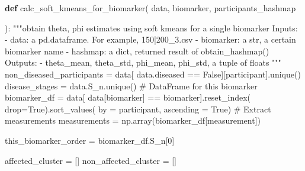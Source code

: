 \documentclass[
  letterpaper,
  DIV=11,
  numbers=noendperiod]{scrreprt}
\newenvironment{Shaded}{\begin{snugshade}}{\end{snugshade}}
\newcommand{\CommentTok}[1]{\textcolor[rgb]{0.37,0.37,0.37}{#1}}
\newcommand{\DecValTok}[1]{\textcolor[rgb]{0.68,0.00,0.00}{#1}}
\newcommand{\KeywordTok}[1]{\textcolor[rgb]{0.00,0.23,0.31}{\textbf{#1}}}
\newcommand{\NormalTok}[1]{\textcolor[rgb]{0.00,0.23,0.31}{#1}}
\newcommand{\OperatorTok}[1]{\textcolor[rgb]{0.37,0.37,0.37}{#1}}
\newcommand{\StringTok}[1]{\textcolor[rgb]{0.13,0.47,0.30}{#1}}
\newcommand{\VariableTok}[1]{\textcolor[rgb]{0.07,0.07,0.07}{#1}}
\begin{document}
\begin{Shaded}
\begin{Highlighting}[]
\KeywordTok{def}\NormalTok{ calc\_soft\_kmeans\_for\_biomarker(}
\NormalTok{        data,}
\NormalTok{        biomarker,}
\NormalTok{        participants\_hashmap}

\NormalTok{):}
    \CommentTok{"""obtain theta, phi estimates using soft kmeans for a single biomarker}
\CommentTok{    Inputs:}
\CommentTok{        {-} data: a pd.dataframe. For example, 150|200\_3.csv}
\CommentTok{        {-} biomarker: a str, a certain biomarker name}
\CommentTok{        {-} hashmap: a dict, returned result of obtain\_hashmap()}
\CommentTok{    Outputs:}
\CommentTok{        {-} theta\_mean, theta\_std, phi\_mean, phi\_std, a tuple of floats}
\CommentTok{    """}
\NormalTok{    non\_diseased\_participants }\OperatorTok{=}\NormalTok{ data[}
\NormalTok{        data.diseased }\OperatorTok{==} \VariableTok{False}\NormalTok{][}\StringTok{\textquotesingle{}participant\textquotesingle{}}\NormalTok{].unique()}
\NormalTok{    disease\_stages }\OperatorTok{=}\NormalTok{ data.S\_n.unique()}
     \CommentTok{\# DataFrame for this biomarker}
\NormalTok{    biomarker\_df }\OperatorTok{=}\NormalTok{ data[}
\NormalTok{        data[}\StringTok{\textquotesingle{}biomarker\textquotesingle{}}\NormalTok{] }\OperatorTok{==}\NormalTok{ biomarker].reset\_index(}
\NormalTok{            drop}\OperatorTok{=}\VariableTok{True}\NormalTok{).sort\_values(}
\NormalTok{                by }\OperatorTok{=} \StringTok{\textquotesingle{}participant\textquotesingle{}}\NormalTok{, ascending }\OperatorTok{=} \VariableTok{True}\NormalTok{)}
    \CommentTok{\# Extract measurements}
\NormalTok{    measurements }\OperatorTok{=}\NormalTok{ np.array(biomarker\_df[}\StringTok{\textquotesingle{}measurement\textquotesingle{}}\NormalTok{])}

\NormalTok{    this\_biomarker\_order }\OperatorTok{=}\NormalTok{ biomarker\_df.S\_n[}\DecValTok{0}\NormalTok{]}

\NormalTok{    affected\_cluster }\OperatorTok{=}\NormalTok{ []}
\NormalTok{    non\_affected\_cluster }\OperatorTok{=}\NormalTok{ []}


\end{Highlighting}
\end{Shaded}
\end{document}

